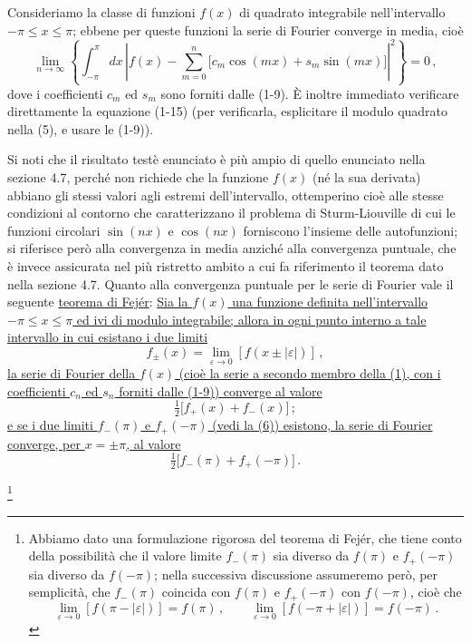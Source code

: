 \documentclass[11pt, a4paper]{book}
\numberwithin{equation}{section}
\begin{document}
Consideriamo la classe di funzioni $f(x)$ di quadrato integrabile nell'intervallo $-\pi \leq x \leq \pi$; ebbene per queste funzioni la serie di Fourier converge in media, cioè
\begin{equation}
  \lim_{n\to\infty}\left\{\int_{-\pi}^{\pi} dx\,\left|f(x)-\sum_{m=0}^{n}\bigl[c_m\cos(mx)+s_m\sin(mx)\bigr]\right|^2\right\} = 0\,, \tag{5}
\end{equation}
dove i coefficienti $c_m$ ed $s_m$ sono forniti dalle (1-9). È inoltre immediato verificare direttamente la equazione (1-15) (per verificarla, esplicitare il modulo quadrato nella (5), e usare le (1-9)).

Si noti che il risultato testè enunciato è più ampio di quello enunciato nella sezione 4.7, perché non richiede che la funzione $f(x)$ (né la sua derivata) abbiano gli stessi valori agli estremi dell'intervallo, ottemperino cioè alle stesse condizioni al contorno che caratterizzano il problema di Sturm-Liouville di cui le funzioni circolari $\sin(nx)$ e $\cos(nx)$ forniscono l'insieme delle autofunzioni; si riferisce però alla convergenza in media anziché alla convergenza puntuale, che è invece assicurata nel più ristretto ambito a cui fa riferimento il teorema dato nella sezione 4.7. Quanto alla convergenza puntuale per le serie di Fourier vale il seguente \underline{teorema di Fejér}: \underline{Sia la $f(x)$ una funzione definita nell'intervallo $-\pi \leq x \leq \pi$ ed ivi di modulo integrabile; allora in ogni punto interno a tale intervallo in cui esistano i due limiti}
\begin{equation}
  f_\pm(x) = \lim_{\varepsilon\to 0}\left[f(x\pm|\varepsilon|)\right]\,, \tag{6}
\end{equation}
\underline{la serie di Fourier della $f(x)$ (cioè la serie a secondo membro della (1), con i coefficienti $c_n$ ed $s_n$ forniti dalle (1-9)) converge al valore}
\[
  \tfrac{1}{2}\bigl[f_+(x)+f_-(x)\bigr]\,;
\]
\underline{e se i due limiti $f_-(\pi)$ e $f_+(-\pi)$ (vedi la (6)) esistono, la serie di Fourier converge, per $x=\pm\pi$, al valore}
\[
  \tfrac{1}{2}\bigl[f_-(\pi)+f_+(-\pi)\bigr]\,.
\]

\footnote{Abbiamo dato una formulazione rigorosa del teorema di Fejér, che tiene conto della possibilità che il valore limite $f_-(\pi)$ sia diverso da $f(\pi)$ e $f_+(-\pi)$ sia diverso da $f(-\pi)$; nella successiva discussione assumeremo però, per semplicità, che $f_-(\pi)$ coincida con $f(\pi)$ e $f_+(-\pi)$ con $f(-\pi)$, cioè che
\[
  \lim_{\varepsilon\to 0}\left[f(\pi-|\varepsilon|)\right] = f(\pi)\,,\qquad
  \lim_{\varepsilon\to 0}\left[f(-\pi+|\varepsilon|)\right] = f(-\pi)\,.
\]}
\end{document}
